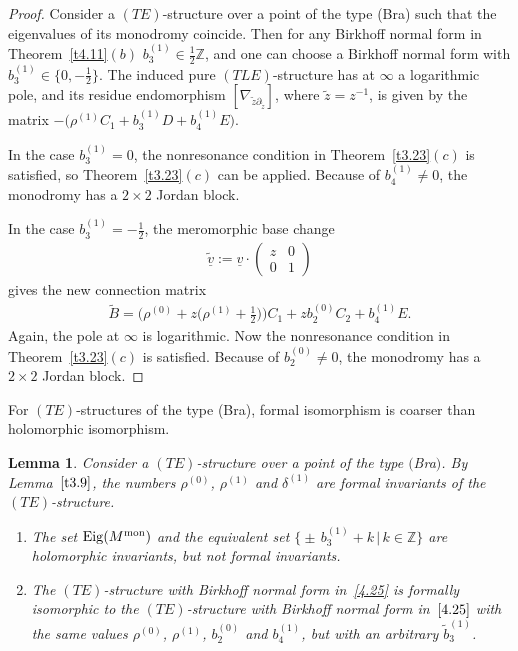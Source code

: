 \documentclass[pdftex]{sigma}%
\numberwithin{equation}{section}
\numberwithin{figure}{section}
\newcommand{\Z}{{\mathbb Z}}
\newcommand{\www}{\widetilde}
\newcommand{\uuuu}{\underline}
\newcommand{\paa}{\partial}
\newcommand{\nnn}{\nabla}
\DeclareMathOperator{\Eig}{Eig}
\newtheorem{Lemma}[Theorem]{Lemma}
\begin{document}
\begin{proof}
Consider a $(TE)$-structure over a point
of the type (Bra) such that the eigenvalues of its monodromy
coincide. Then for any Birkhoff normal form in
Theorem~\ref{t4.11}$(b)$ $b_3^{(1)}\in\frac{1}{2}\Z$,
and one can choose a Birkhoff normal form with
$b_3^{(1)}\in\big\{0,-\frac{1}{2}\big\}$.
The induced pure $(TLE)$-structure
has at $\infty$ a logarithmic pole, and its residue
endomorphism $[\nnn_{\www z\paa_{\www z}}]$, where
$\www z=z^{-1}$, is given by the
matrix $-\big(\rho^{(1)}C_1+b_3^{(1)}D+b_4^{(1)}E\big)$.

In the case $b_3^{(1)}=0$, the nonresonance condition
in Theorem~\ref{t3.23}$(c)$ is satisfied,
so Theorem~\ref{t3.23}$(c)$ can be applied.
Because of $b_4^{(1)}\neq 0$,
the monodromy has a $2\times 2$ Jordan block.

In the case $b_3^{(1)}=-\frac{1}{2}$, the meromorphic
base change
\begin{gather*}
\uuuu{\www v}:=\uuuu{v}\cdot\begin{pmatrix}z&0\\0&1
\end{pmatrix}
\end{gather*}
gives the new connection matrix
\begin{gather*}
\www B=\bigg(\rho^{(0)}+z\bigg(\rho^{(1)}+\frac{1}{2}\bigg)\bigg)C_1+zb_2^{(0)}C_2+b_4^{(1)}E.
\end{gather*}
Again, the pole at $\infty$ is logarithmic.
Now the nonresonance condition in Theorem~\ref{t3.23}$(c)$
is satisfied. Because of $b_2^{(0)}\neq 0$,
the monodromy has a $2\times 2$ Jordan block.
\end{proof}

For $(TE)$-structures of the type (Bra), formal isomorphism
is coarser than holomorphic isomorphism.

\begin{Lemma}\label{t4.14}
Consider a $(TE)$-structure over a point of the type $($Bra$)$.
By Lemma~$\ref{t3.9}$, the numbers $\rho^{(0)}$, $\rho^{(1)}$
and $\delta^{(1)}$ are formal invariants of the
$(TE)$-structure.

\begin{enumerate}\itemsep=0pt
\item[$(a)$] The set $\Eig(M^{\rm mon})$ and the equivalent set
$\big\{{\pm}\, b_3^{(1)}+k\,|\, k\in\Z\big\}$ are holomorphic invariants,
but not formal invariants.

\item[$(b)$]
The $(TE)$-structure with Birkhoff normal form in~\eqref{4.25}
is formally isomorphic to the $(TE)$-structure
with Birkhoff normal form in~$\eqref{4.25}$
with the same values $\rho^{(0)}$, $\rho^{(1)}$, $b_2^{(0)}$ and $b_4^{(1)}$,
but with an arbitrary $\www b_3^{(1)}$.
\end{enumerate}
\end{Lemma}
\end{document}

